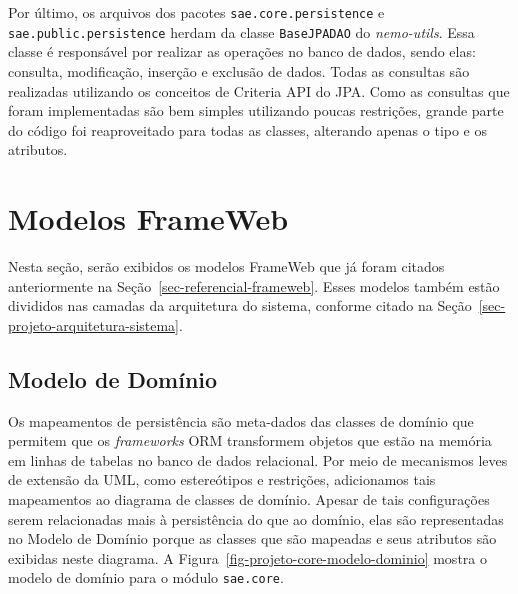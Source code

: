 Por último, os arquivos dos pacotes \texttt{sae.core.persistence} e \texttt{sae.public.per\-sistence} herdam da classe \texttt{BaseJPADAO} do \textit{nemo-utils}. Essa classe é responsável por realizar as operações no banco de dados, sendo elas: consulta, modificação, inserção e exclusão de dados. Todas as consultas são realizadas utilizando os conceitos de Criteria API do JPA. Como as consultas que foram implementadas são bem simples utilizando poucas restrições, grande parte do código foi reaproveitado para todas as classes, alterando apenas o tipo e os atributos.










\section{Modelos FrameWeb}
\label{sec-projeto-modelos-frame-web}

Nesta seção, serão exibidos os modelos FrameWeb que já foram citados anteriormente na Seção~\ref{sec-referencial-frameweb}. Esses modelos também estão divididos nas camadas da arquitetura do sistema, conforme citado na Seção~\ref{sec-projeto-arquitetura-sistema}.




\subsection{Modelo de Domínio}

Os mapeamentos de persistência são meta-dados das classes de domínio que permitem que os \textit{frameworks} ORM transformem objetos que estão na memória em linhas de tabelas no banco de dados relacional. Por meio de mecanismos leves de extensão da UML, como estereótipos e restrições, adicionamos tais mapeamentos ao diagrama de classes de domínio. Apesar de tais configurações serem relacionadas mais à persistência do que ao domínio, elas são representadas no Modelo de Domínio porque as classes que são mapeadas e seus atributos são exibidas neste diagrama. A Figura~\ref{fig-projeto-core-modelo-dominio} mostra o modelo de domínio para o módulo \texttt{sae.core}.

